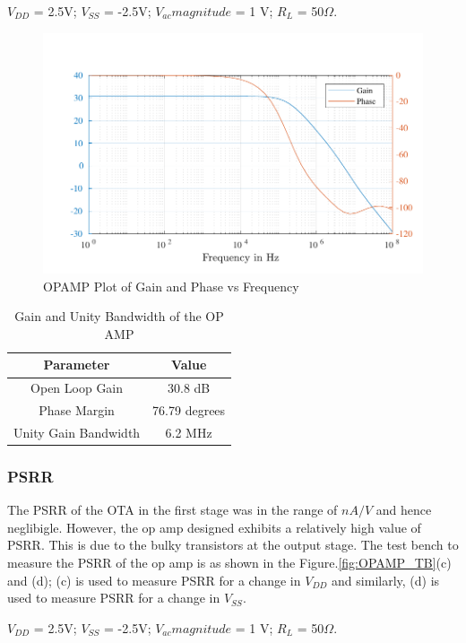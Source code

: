 $V_{DD}$ = 2.5V; $V_{SS}$ = -2.5V; $V_{ac} magnitude $ = 1 V; $R_L$ = 50$\Omega$.
\begin{figure} [H]
\centering
\includegraphics[scale=1]{Figures/Plots/OPAMP_Gain_PM.pdf}
\caption{OPAMP Plot of Gain and Phase vs Frequency}
\label{fig:OPAMP_gain_pm_gbw}
\end{figure}

\begin{table} [H]
\centering
\begin{tabular}{@{}cc@{}}
\toprule
Parameter					& Value				\\ \midrule
Open Loop Gain				& 30.8 dB			\\
Phase Margin				& 76.79 degrees		\\
Unity Gain Bandwidth		& 6.2 MHz			\\
\bottomrule
\end{tabular}
\caption{Gain and Unity Bandwidth of the OP AMP}
\label{tab:OPAMP_Gain_UBW}
\end{table}

\subsubsection{PSRR}
The PSRR of the OTA in the first stage was in the range of $nA/V$ and hence neglibigle. However, the op amp designed exhibits a relatively high value of PSRR. This is due to the bulky transistors at the output stage. The test bench to measure the PSRR of the op amp is as shown in the Figure.\ref{fig:OPAMP_TB}(c) and (d); (c) is used to measure PSRR for a change in $V_{DD}$ and similarly, (d) is used to measure PSRR for a change in $V_{SS}$.

$V_{DD}$ = 2.5V; $V_{SS}$ = -2.5V; $V_{ac} magnitude $ = 1 V; $R_L$ = 50$\Omega$.

